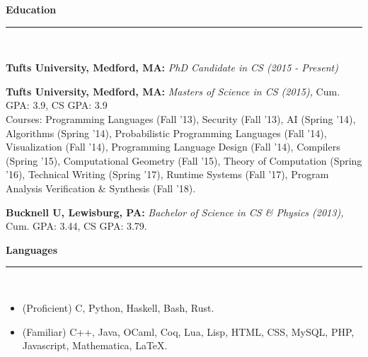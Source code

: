 {\large\bf Education}\\[-.3cm]
\rule{\linewidth}{.5pt}\\[.2cm]
\begin{minipage}{\linewidth}

{\bf Tufts University, Medford, MA:}
{\it PhD Candidate in CS (2015 - Present)}

{\bf Tufts University, Medford, MA:}
{\it Masters of Science in CS (2015),} Cum. GPA: 3.9, CS GPA: 3.9\\
Courses: Programming Languages (Fall '13), Security (Fall '13), AI (Spring
'14), Algorithms (Spring '14), Probabilistic Programming Languages (Fall '14),
Visualization (Fall '14), Programming Language Design (Fall '14), Compilers
(Spring '15), Computational Geometry (Fall '15), Theory of Computation (Spring
'16), Technical Writing (Spring '17), Runtime Systems (Fall '17), Program
Analysis Verification \& Synthesis (Fall '18).

{\bf Bucknell U, Lewisburg, PA:}
{\it Bachelor of Science in CS \& Physics (2013),} %
Cum. GPA: 3.44, CS GPA: 3.79.\\
\end{minipage}

\vspace{-.4cm}
{\large\bf Languages}\\[-.3cm]
\rule{\linewidth}{.5pt}\\[.2cm]
\begin{minipage}{\linewidth}

\begin{itemize}[leftmargin=.5cm]
\item (Proficient) C, Python, Haskell, Bash, Rust.
\item (Familiar) C++, Java, OCaml, Coq, Lua, Lisp,
HTML, CSS, MySQL, PHP, Javascript, Mathematica, \LaTeX.
\end{itemize}

\end{minipage}


